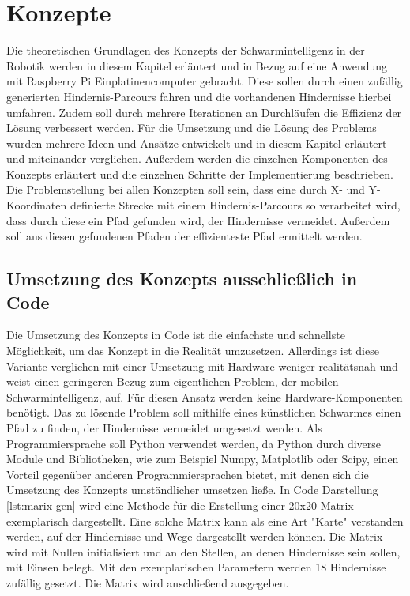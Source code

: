 \label{ch:pi}
\section{Konzepte}
Die theoretischen Grundlagen des Konzepts der Schwarmintelligenz in der Robotik werden in diesem Kapitel erläutert und in Bezug auf eine Anwendung mit Raspberry Pi Einplatinencomputer gebracht. Diese sollen durch einen zufällig generierten Hindernis-Parcours fahren und die vorhandenen Hindernisse hierbei umfahren. Zudem soll durch mehrere Iterationen an Durchläufen die Effizienz der Lösung verbessert werden. Für die Umsetzung und die Lösung des Problems wurden mehrere Ideen und Ansätze entwickelt und in diesem Kapitel erläutert und miteinander verglichen. Außerdem werden die einzelnen Komponenten des Konzepts erläutert und die einzelnen Schritte der Implementierung beschrieben. Die Problemstellung bei allen Konzepten soll sein, dass eine durch X- und Y-Koordinaten definierte Strecke mit einem Hindernis-Parcours so verarbeitet wird, dass durch diese ein Pfad gefunden wird, der Hindernisse vermeidet. Außerdem soll aus diesen gefundenen Pfaden der effizienteste Pfad ermittelt werden.

\subsection{Umsetzung des Konzepts ausschließlich in Code}
Die Umsetzung des Konzepts in Code ist die einfachste und schnellste Möglichkeit, um das Konzept in die Realität umzusetzen. Allerdings ist diese Variante verglichen mit einer Umsetzung mit Hardware weniger realitätsnah und weist einen geringeren Bezug zum eigentlichen Problem, der mobilen Schwarmintelligenz, auf. Für diesen Ansatz werden keine Hardware-Komponenten benötigt. Das zu lösende Problem soll mithilfe eines künstlichen Schwarmes einen Pfad zu finden, der Hindernisse vermeidet umgesetzt werden. Als Programmiersprache soll Python verwendet werden, da Python durch diverse Module und Bibliotheken, wie zum Beispiel Numpy, Matplotlib oder Scipy, einen Vorteil gegenüber anderen Programmiersprachen bietet, mit denen sich die Umsetzung des Konzepts umständlicher umsetzen ließe. In Code Darstellung \autoref{lst:marix-gen} wird eine Methode für die Erstellung einer 20x20 Matrix exemplarisch dargestellt. Eine solche Matrix kann als eine Art "Karte" verstanden werden, auf der Hindernisse und Wege dargestellt werden können. Die Matrix wird mit Nullen initialisiert und an den Stellen, an denen Hindernisse sein sollen, mit Einsen belegt. Mit den exemplarischen Parametern werden 18 Hindernisse zufällig gesetzt. Die Matrix wird anschließend ausgegeben.

